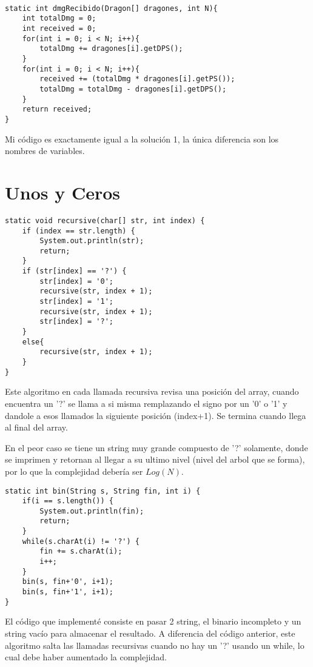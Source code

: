 \documentclass[a4paper,11pt]{article}
\theoremstyle{mytheor}
\begin{document}
\pagebreak
\begin{lstlisting}[label={list:first},caption=Solución 1 y Diagnóstico.]

static int dmgRecibido(Dragon[] dragones, int N){
    int totalDmg = 0;
    int received = 0;
    for(int i = 0; i < N; i++){
        totalDmg += dragones[i].getDPS();
    }
    for(int i = 0; i < N; i++){
        received += (totalDmg * dragones[i].getPS());
        totalDmg = totalDmg - dragones[i].getDPS();
    }
    return received;
}
\end{lstlisting}
Mi código es exactamente igual a la solución 1, la única diferencia son los nombres de variables.



\section*{Unos y Ceros}
\begin{lstlisting}[label={list:second},caption=Solución 1.]
static void recursive(char[] str, int index) {
	if (index == str.length) {
		System.out.println(str);
		return;
	}
	if (str[index] == '?') {
		str[index] = '0';
		recursive(str, index + 1);
		str[index] = '1';
		recursive(str, index + 1);
		str[index] = '?';	
	}
	else{
		recursive(str, index + 1);
	}
}
\end{lstlisting}
Este algoritmo en cada llamada recursiva revisa una posición del array, cuando encuentra un '?' se llama a si misma remplazando el signo por un '0' o '1' y dandole a esos llamados la siguiente posición (index+1). Se termina cuando llega al final del array.

En el peor caso se tiene un string muy grande compuesto de '?' solamente, donde se imprimen y retornan al llegar a su ultimo nivel (nivel del arbol que se forma), por lo que la complejidad debería ser $Log(N)$.


\pagebreak
\begin{lstlisting}[label={list:second},caption=Solución Tarea 1.]
static int bin(String s, String fin, int i) {
	if(i == s.length()) {
		System.out.println(fin);
		return;
	}
	while(s.charAt(i) != '?') {
		fin += s.charAt(i);
		i++;
	}
	bin(s, fin+'0', i+1);
	bin(s, fin+'1', i+1);
}
\end{lstlisting}

El código que implementé consiste en pasar 2 string, el binario incompleto y un string vacío para almacenar el resultado. A diferencia del código anterior, este algoritmo salta las llamadas recursivas cuando no hay un '?' usando un while, lo cual debe haber aumentado la complejidad. 
\end{document}
